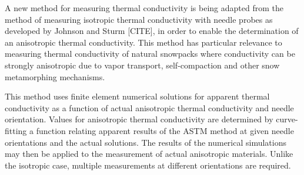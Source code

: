 A new method for measuring thermal conductivity is being adapted from the method
of measuring isotropic thermal conductivity with needle probes as developed by
Johnson and Sturm [CITE], in order to enable the determination of an anisotropic
thermal conductivity. This method has particular relevance to measuring thermal
conductivity of natural snowpacks where conductivity can be strongly anisotropic
due to vapor transport, self-compaction and other snow metamorphing mechanisms.

This method uses finite element numerical solutions for apparent thermal
conductivity as a function of actual anisotropic thermal conductivity and needle
orientation. Values for anisotropic thermal conductivity are determined by
curve-fitting a function relating apparent results of the ASTM method at given
needle orientations and the actual solutions. The results of the numerical
simulations may then be applied to the measurement of actual anisotropic
materials. Unlike the isotropic case, multiple measurements at different
orientations are required.
